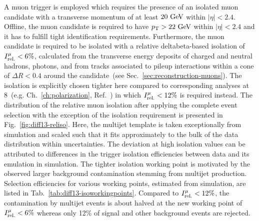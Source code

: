 A muon trigger is employed which requires the presence of an isolated muon candidate with a transverse momentum of at least $20~\textrm{GeV}$ within $|\eta|<2.4$. Offline, the muon candidate is required to have $p_\textrm{T}>22~\textrm{GeV}$ within $|\eta|<2.4$ and it has to fulfill tight identification requirements. Furthermore, the muon candidate is required to be isolated with a relative \gls{deltabeta}-based isolation of $\muiso<6\%$, calculated from the transverse energy deposits of charged and neutral hadrons, photons, and from tracks associated to pileup interactions within a cone of $\Delta R<0.4$ around the candidate~(see Sec.~\ref{sec:reconstruction-muons}). The isolation is explicitly chosen tighter here compared to corresponding analyses at 8~\TeV (e.g. Ch.~\ref{ch:polarization}, Ref.~\cite{Khachatryan:2014iya}) in which $\muiso<12\%$ is required instead. The distribution of the relative muon isolation after applying the complete event selection with the exception of the isolation requirement is presented in Fig.~\ref{fig:diff13-reliso}. Here, the multijet template is taken exceptionally from simulation and scaled such that it fits approximately to the bulk of the data distribution within uncertainties. The deviation at high isolation values can be attributed to differences in the trigger isolation efficiencies between data and its emulation in simulation. The tighter isolation working point is motivated by the observed larger background contamination stemming from multijet production. Selection efficiencies for various working points, estimated from simulation, are listed in Tab.~\ref{tab:diff13-isoworkingpoints}. Compared to $\muiso<12\%$, the contamination by multijet events is about halved at the new working point of $\muiso<6\%$ whereas only 12\% of signal and other background events are rejected.


